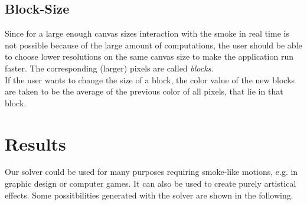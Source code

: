 \documentclass[a4paper,10pt,oneside,final,german,openbib,pdftex,titlepage]{scrbook}
\begin{document}
\section{Block-Size}
Since for a large enough canvas sizes interaction with the smoke in real time is not possible because of the large amount of computations, the user should be able to choose lower resolutions on the same canvas size to make the application run faster. The corresponding (larger) pixels are called \emph{blocks}.\\

If the user wants to change the size of a block, the color value of the new blocks are taken to be the average of the previous color of all pixels, that lie in that block.
%
%
%
\chapter{Results}
Our solver could be used for many purposes requiring smoke-like motions, e.g. in graphic design or computer games. It can also be used to create purely artistical effects. Some possitbilities generated with the solver are shown in the following.\\
\end{document}
